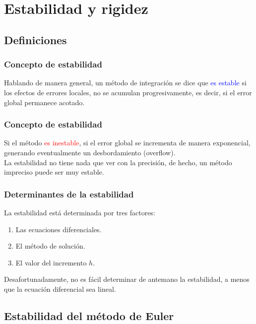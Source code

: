 \documentclass[12pt]{beamer}
\begin{document}
\section{Estabilidad y rigidez}
\subsection{Definiciones}

\begin{frame}
\frametitle{Concepto de estabilidad}
Hablando de manera general, un método de integración se dice que \textcolor{blue}{es estable} si los efectos de errores locales, no se acumulan progresivamente, es decir, si el error global permanece acotado.
\end{frame}
\begin{frame}
\frametitle{Concepto de estabilidad}
Si el método \textcolor{red}{es inestable}, si el error global se incrementa de manera exponencial, generando eventualmente un desbordamiento (overflow).
\\
\bigskip
\pause
La estabilidad no tiene nada que ver con la precisión, de hecho, un método impreciso puede ser muy estable.
\end{frame}
\begin{frame}
\frametitle{Determinantes de la estabilidad}
La estabilidad está determinada por tres factores:
\pause
{}
\begin{enumerate}[<+->]
\item Las ecuaciones diferenciales.
\item El método de solución.
\item El valor del incremento $h$.
\end{enumerate}
\pause
Desafortunadamente, no es fácil determinar de antemano la estabilidad, a menos que la ecuación diferencial sea lineal.
\end{frame}

\subsection{Estabilidad del método de Euler}
\end{document}
